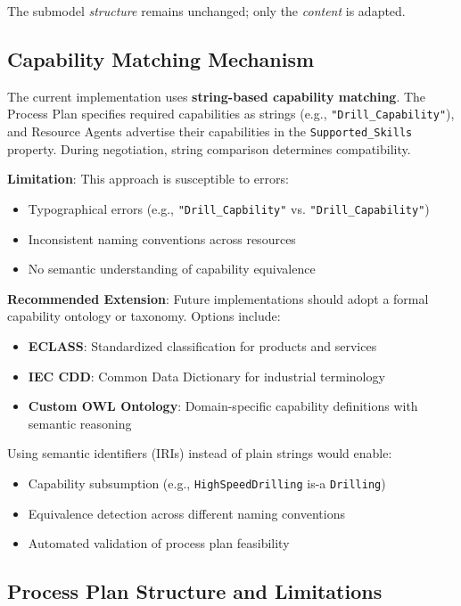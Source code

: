 The submodel \textit{structure} remains unchanged; only the \textit{content} is adapted.
\subsection{Capability Matching Mechanism}
\label{subsec:capability_matching}

The current implementation uses \textbf{string-based capability matching}. The Process Plan specifies required capabilities as strings (e.g., \texttt{"Drill\_Capability"}), and Resource Agents advertise their capabilities in the \texttt{Supported\_Skills} property. During negotiation, string comparison determines compatibility.

\textbf{Limitation}: This approach is susceptible to errors:
\begin{itemize}
    \item Typographical errors (e.g., \texttt{"Drill\_Capbility"} vs. \texttt{"Drill\_Capability"})
    \item Inconsistent naming conventions across resources
    \item No semantic understanding of capability equivalence
\end{itemize}

\textbf{Recommended Extension}: Future implementations should adopt a formal capability ontology or taxonomy. Options include:
\begin{itemize}
    \item \textbf{ECLASS}: Standardized classification for products and services
    \item \textbf{IEC CDD}: Common Data Dictionary for industrial terminology
    \item \textbf{Custom OWL Ontology}: Domain-specific capability definitions with semantic reasoning
\end{itemize}

Using semantic identifiers (IRIs) instead of plain strings would enable:
\begin{itemize}
    \item Capability subsumption (e.g., \texttt{HighSpeedDrilling} is-a \texttt{Drilling})
    \item Equivalence detection across different naming conventions
    \item Automated validation of process plan feasibility
\end{itemize}
\subsection{Process Plan Structure and Limitations}
\label{subsec:process_plan_limitations}

